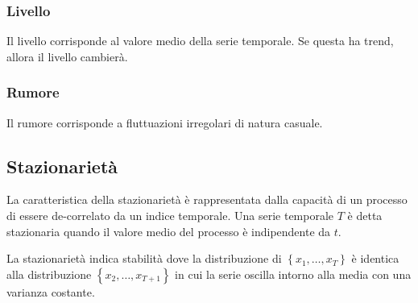 \subsubsection{Livello}
Il livello corrisponde al valore medio della serie temporale. Se questa ha trend, allora il livello cambierà.

\subsubsection{Rumore}
Il rumore corrisponde a fluttuazioni irregolari di natura casuale.

\subsection{Stazionarietà}
La caratteristica della stazionarietà è rappresentata dalla capacità di un processo di essere de-correlato da un indice temporale. Una serie temporale $T$ è detta stazionaria quando il valore medio del processo è indipendente da $t$. 

La stazionarietà indica stabilità dove la distribuzione di $\left\{ x_1, \ldots, x_T  \right\}$ è identica alla distribuzione $\left\{ x_2, \ldots, x_{T+1}  \right\}$ in cui la serie oscilla intorno alla media con una varianza costante.